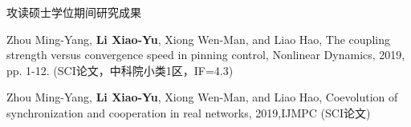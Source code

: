 \begin{szuAppendix}{攻读硕士学位期间研究成果}
\begin{spacing}{1.5}
\begin{flushleft}
\songti{}
\end{flushleft}
\songti{}
\vspace{0.3\baselineskip}

\noindent
[1] Zhou Ming-Yang, \textbf{Li Xiao-Yu}, Xiong Wen-Man, and Liao Hao, The coupling strength versus convergence speed in pinning control, Nonlinear Dynamics, 2019, pp. 1-12. (SCI论文，中科院小类1区，IF=4.3)

\smallskip
\noindent
[2] Zhou Ming-Yang, \textbf{Li Xiao-Yu}, Xiong Wen-Man, and Liao Hao, Coevolution of synchronization and cooperation in real networks, 2019,IJMPC (SCI论文)
%
%
%



%

\end{spacing}
\end{szuAppendix}
